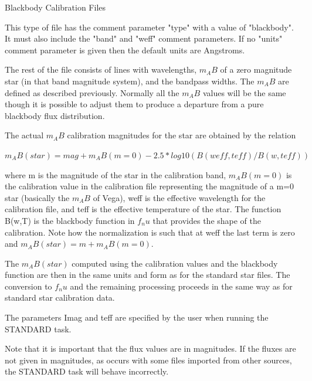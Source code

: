 Blackbody Calibration Files

This type of file has the comment parameter "type" with a value of
"blackbody". It must also include the "band" and "weff" comment
parameters. If no "units" comment parameter is given then the default
units are Angstroms.

The rest of the file consists of lines with wavelengths, $m_AB$ of a
zero magnitude star (in that band magnitude system), and the bandpass
widths. The $m_AB$ are defined as described previously. Normally all the
$m_AB$ values will be the same though it is possible to adjust them to
produce a departure from a pure blackbody flux distribution.

The actual $m_AB$ calibration magnitudes for the star are obtained by the relation

$m_AB(star) = mag + m_AB(m=0) - 2.5 * log10 (B(weff,teff)/B(w,teff))$

where m is the magnitude of the star in the calibration band,
$m_AB(m=0)$ is the calibration value in the calibration file
representing the magnitude of a m=0 star (basically the $m_AB$ of Vega),
weff is the effective wavelength for the calibration file, and teff is
the effective temperature of the star. The function B(w,T) is the
blackbody function in $f_nu$ that provides the shape of the
calibration. Note how the normalization is such that at weff the last
term is zero and $m_AB(star) = m + m_AB(m=0)$.

The $m_AB(star)$ computed using the calibration values and the blackbody
function are then in the same units and form as for the standard star
files. The conversion to $f_nu$ and the remaining processing proceeds in
the same way as for standard star calibration data.

The parameters Imag and teff are specified by the user when running the STANDARD task.

Note that it is important that the flux values are in magnitudes. If
the fluxes are not given in magnitudes, as occurs with some files
imported from other sources, the STANDARD task will behave
incorrectly.


